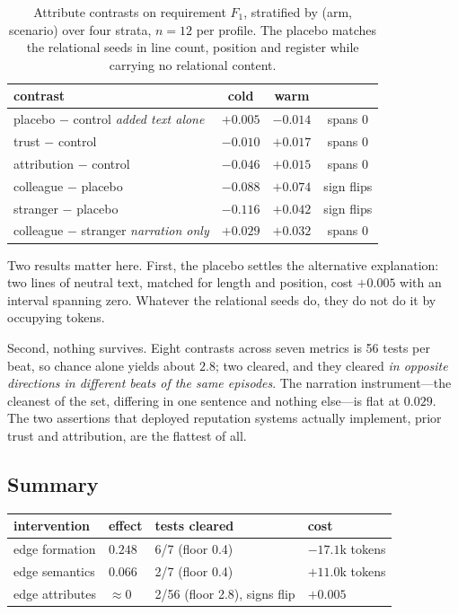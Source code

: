 \begin{table}[t]
\centering\small
\caption{Attribute contrasts on requirement $F_1$, stratified by (arm, scenario)
over four strata, $n=12$ per profile. The placebo matches the relational seeds
in line count, position and register while carrying no relational content.}
\label{tab:attrs}
\begin{tabular}{@{}lccc@{}}
\toprule
\textbf{contrast} & \textbf{cold} & \textbf{warm} & \\
\midrule
placebo $-$ control \hfill\textit{added text alone} & $+0.005$ & $-0.014$ & spans 0 \\
trust $-$ control                                    & $-0.010$ & $+0.017$ & spans 0 \\
attribution $-$ control                              & $-0.046$ & $+0.015$ & spans 0 \\
colleague $-$ placebo                                & $-0.088$ & $\mathbf{+0.074}$ & sign flips \\
stranger $-$ placebo                                 & $\mathbf{-0.116}$ & $+0.042$ & sign flips \\
colleague $-$ stranger \hfill\textit{narration only} & $+0.029$ & $+0.032$ & spans 0 \\
\bottomrule
\end{tabular}
\end{table}

Two results matter here. First, the placebo settles the alternative explanation:
two lines of neutral text, matched for length and position, cost $+0.005$ with an
interval spanning zero. Whatever the relational seeds do, they do not do it by
occupying tokens.

Second, nothing survives. Eight contrasts across seven metrics is 56 tests per
beat, so chance alone yields about $2.8$; two cleared, and they cleared \emph{in
opposite directions in different beats of the same episodes}. The narration
instrument---the cleanest of the set, differing in one sentence and nothing
else---is flat at $0.029$. The two assertions that deployed reputation systems
actually implement, prior trust and attribution, are the flattest of all.

\subsection{Summary}

\begin{center}\small
\begin{tabular}{@{}llll@{}}
\toprule
\textbf{intervention} & \textbf{effect} & \textbf{tests cleared} & \textbf{cost} \\
\midrule
edge formation  & $0.248$ & 6/7 \quad (floor 0.4) & $-17.1$k tokens \\
edge semantics  & $0.066$ & 2/7 \quad (floor 0.4) & $+11.0$k tokens \\
edge attributes & $\approx 0$ & 2/56 \quad (floor 2.8), signs flip & $+0.005$ \\
\bottomrule
\end{tabular}
\end{center}
